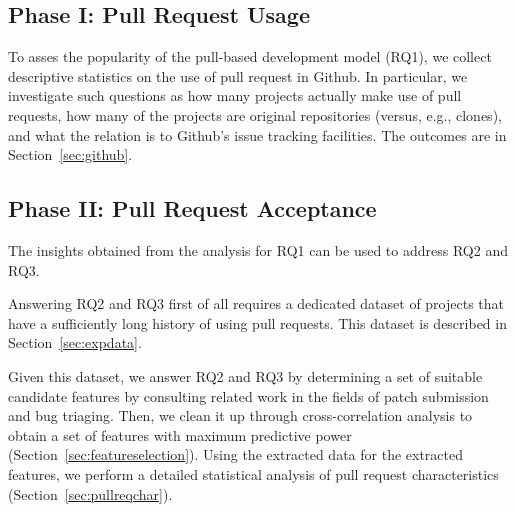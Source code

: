 \documentclass{acm_proc_article-sp}
\begin{document}
\subsection{Phase I: Pull Request Usage}

To asses the popularity of the pull-based development model (RQ1), we collect descriptive statistics on the use of pull request in Github. 
In particular, we investigate such questions as how many projects actually make use of
pull requests, how many of the projects are original repositories
(versus, e.g., clones), and what the relation is to Github's issue
tracking facilities. The outcomes are in Section~\ref{sec:github}.

\subsection{Phase II: Pull Request Acceptance}
\label{sec:expprocess}

The insights obtained from the analysis for RQ1 can be used to address
RQ2 and RQ3. 

Answering RQ2 and RQ3 first of all requires a dedicated dataset of
projects that have a sufficiently long history of using pull requests.
This dataset is described in Section~\ref{sec:expdata}.



% 




Given this dataset, we answer RQ2 and RQ3 by determining
a set of suitable candidate
features by consulting related work in the fields of patch submission and bug
triaging. Then, we clean it up through cross-correlation analysis to obtain a
set of features with maximum predictive power
(Section~\ref{sec:featureselection}). Using the extracted data for the 
extracted features, we perform a detailed statistical analysis of pull request
characteristics (Section~\ref{sec:pullreqchar}).
\end{document}
